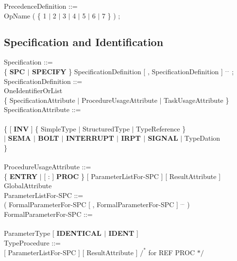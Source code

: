 PrecedenceDefinition ::= \\
 OpName ( \{ 1 $\mid$ 2 $\mid$ 3 $\mid$ 4 $\mid$ 5 $\mid$ 6 $\mid$ 7 \} ) ;

\subsection{Specification and Identification}    %

Specification ::=\\
\x \{ {\bf SPC $\mid$ SPECIFY} \} SpecificationDefinition [ , SpecificationDefinition ] $^{...}$ ;\\

SpecificationDefinition ::=\\
\x OneIdentifierOrList\\
\x \{ SpecificationAttribute $\mid$ ProcedureUsageAttribute $\mid$ TaskUsageAttribute \}\\

SpecificationAttribute ::=\\
\x [ VirtualDimensionList ] \\
\x \{ [ {\bf INV} ] \{ SimpleType $\mid$ StructuredType $\mid$ TypeReference \} \\
\x \x $\mid$ {\bf SEMA $\mid$ BOLT $\mid$ INTERRUPT $\mid$ IRPT $\mid$ SIGNAL} $\mid$ TypeDation\\
\x \}\\
\x [ GlobalAttribute ]\\

ProcedureUsageAttribute ::=\\
\x \{ {\bf ENTRY} $\mid$ [ : ] {\bf PROC} \} [ ParameterListFor-SPC ] [ ResultAttribute ] \\
\x \x GlobalAttribute\\

ParameterListFor-SPC ::=\\
\x ( FormalParameterFor-SPC [ , FormalParameterFor-SPC ] $^{...}$ )\\
        
FormalParameterFor-SPC ::=\\
\\
\x ParameterType [ {\bf IDENTICAL $\mid$ IDENT} ]\\

TypeProcedure ::=\\
 [ ParameterListFor-SPC ] [ ResultAttribute ] $/^*$ for REF PROC $*/$\\

